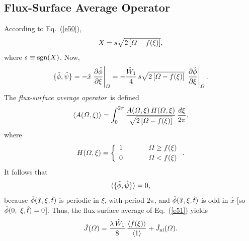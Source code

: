 \documentclass[12pt,prb,aps]{revtex4-1}
\begin{document}
\subsection{Flux-Surface Average Operator}
According to Eq.~(\ref{e50}), 
\begin{equation}
X = s\sqrt{2\left[{\mit\Omega}-f(\xi)\right]},
\end{equation}
where $s\equiv {\rm sgn}(X)$. Now,
\begin{equation}
 \{\skew{3}\hat{\phi},\hat{\psi}\} = -\hat{x}\left.\frac{\partial\hat{\phi}}{\partial\xi}\right|_{\mit\Omega}= -\frac{\hat{W}_1}{4}\,
 s\sqrt{2\left[{\mit\Omega}-f(\xi)\right]}\,\left.\frac{\partial\hat{\phi}}{\partial\xi}\right|_{\mit\Omega}.
 \end{equation}
 The {\em flux-surface average operator}\,\cite{ruth} is defined
 \begin{equation}\label{e54}
 \langle A({\mit\Omega},\xi)\rangle= \int_{0}^{2\pi}\frac{A({\mit\Omega},\xi)\,H({\mit\Omega},\xi)}
 {\sqrt{2\left[{\mit\Omega}-f(\xi)\right]}}\,\frac{d\xi}{2\pi},
 \end{equation}
 where
 \begin{equation}\label{e55}
 H({\mit\Omega},\xi) = \left\{
 \begin{array}{ccc} 1&~~~~~&{\mit\Omega}\geq f(\xi)\\[0.5ex]
 0 &&{\mit\Omega}< f(\xi)\end{array}\right..
 \end{equation}
 It follows that
 \begin{equation}
 \langle \{\skew{3}\hat{\phi},\hat{\psi}\}\rangle = 0,
 \end{equation}
 because $\skew{3}\hat{\phi}(\hat{x},\xi,\hat{t})$ is periodic in $\xi$, with period $2\pi$, and $\skew{3}\hat{\phi}(\hat{x},\xi,\hat{t})$
 is odd in $\hat{x}$ [so $\skew{3}\hat{\phi}(0,\
 \xi,\hat{t})=0$]. Thus, the flux-surface average of Eq.~(\ref{e51}) yields
 \begin{equation}\label{e57}
 \hat{J}({\mit\Omega}) = \frac{\lambda\,\hat{W}_1}{8}\,\frac{\langle f(\xi)\rangle}{\langle 1\rangle} + \hat{J}_{\rm ni}({\mit\Omega}).
 \end{equation}
\end{document}
